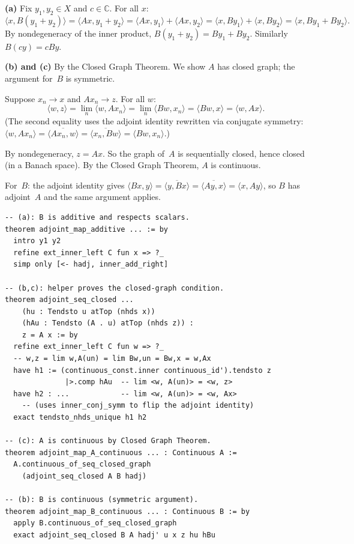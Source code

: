 \documentclass[12pt,oneside]{book}
\theoremstyle{plain}
\theoremstyle{definition}
\theoremstyle{remark}
\begin{document}
\begin{proofbox}
\textbf{(a)} Fix $y_1, y_2 \in X$ and $c \in \mathbb{C}$. For all $x$:
\[
  \langle x, B(y_1 + y_2) \rangle = \langle Ax, y_1 + y_2 \rangle
  = \langle Ax, y_1 \rangle + \langle Ax, y_2 \rangle
  = \langle x, By_1 \rangle + \langle x, By_2 \rangle
  = \langle x, By_1 + By_2 \rangle.
\]
By nondegeneracy of the inner product, $B(y_1 + y_2) = By_1 + By_2$.
Similarly $B(cy) = cBy$.

\medskip
\textbf{(b) and (c)} By the Closed Graph Theorem. We show $A$ has
closed graph; the argument for~$B$ is symmetric.

Suppose $x_n \to x$ and $Ax_n \to z$. For all $w$:
\[
  \langle w, z \rangle = \lim_n \langle w, Ax_n \rangle
  = \lim_n \langle Bw, x_n \rangle = \langle Bw, x \rangle
  = \langle w, Ax \rangle.
\]
(The second equality uses the adjoint identity rewritten via conjugate
symmetry: $\langle w, Ax_n \rangle = \overline{\langle Ax_n, w \rangle}
= \overline{\langle x_n, Bw \rangle} = \langle Bw, x_n \rangle$.)

By nondegeneracy, $z = Ax$. So the graph of~$A$ is sequentially closed,
hence closed (in a Banach space). By the Closed Graph Theorem, $A$ is
continuous.

For~$B$: the adjoint identity gives $\langle Bx, y \rangle =
\overline{\langle y, Bx \rangle} = \overline{\langle Ay, x \rangle}
= \langle x, Ay \rangle$, so $B$ has adjoint~$A$ and the same argument
applies.
\end{proofbox}

\begin{leanbox}
\begin{Verbatim}[fontsize=\small]
-- (a): B is additive and respects scalars.
theorem adjoint_map_additive ... := by
  intro y1 y2
  refine ext_inner_left C fun x => ?_
  simp only [<- hadj, inner_add_right]

-- (b,c): helper proves the closed-graph condition.
theorem adjoint_seq_closed ...
    (hu : Tendsto u atTop (nhds x))
    (hAu : Tendsto (A . u) atTop (nhds z)) :
    z = A x := by
  refine ext_inner_left C fun w => ?_
  -- w,z = lim w,A(un) = lim Bw,un = Bw,x = w,Ax
  have h1 := (continuous_const.inner continuous_id').tendsto z
              |>.comp hAu  -- lim <w, A(un)> = <w, z>
  have h2 : ...            -- lim <w, A(un)> = <w, Ax>
    -- (uses inner_conj_symm to flip the adjoint identity)
  exact tendsto_nhds_unique h1 h2

-- (c): A is continuous by Closed Graph Theorem.
theorem adjoint_map_A_continuous ... : Continuous A :=
  A.continuous_of_seq_closed_graph
    (adjoint_seq_closed A B hadj)

-- (b): B is continuous (symmetric argument).
theorem adjoint_map_B_continuous ... : Continuous B := by
  apply B.continuous_of_seq_closed_graph
  exact adjoint_seq_closed B A hadj' u x z hu hBu
\end{Verbatim}
\end{leanbox}
\end{document}

